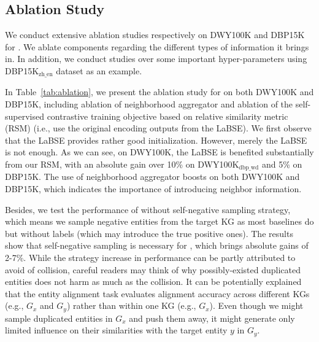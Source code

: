 





%

\subsection{Ablation Study} \label{sec:ablation}
We conduct extensive ablation studies respectively on DWY100K and DBP15K for \solution. We ablate components regarding the different types of information it brings in. In addition, we conduct studies over some important hyper-parameters using DBP15K$_{\text{zh\_en}}$ dataset as an example.
 
In Table~\ref{tab:ablation}, we present the ablation study for \solution on both DWY100K and DBP15K, including ablation of neighborhood aggregator and ablation of the self-supervised contrastive training objective based on relative similarity metric (RSM) (i.e., use the original encoding outputs from the LaBSE). We first observe that the LaBSE provides rather good initialization. However, merely the LaBSE is not enough. As we can see, on DWY100K, the LaBSE is benefited substantially from our RSM, with an absolute gain over 10\% on DWY100K$_{\text{dbp\_wd}}$ and 5\% on DBP15K. The use of neighborhood aggregator boosts \solution on both DWY100K and DBP15K, which indicates the importance of introducing neighbor information. 

Besides, we test the performance of \solution without self-negative sampling strategy, which means we sample negative entities from the target KG as most baselines do but without labels (which may introduce the true positive ones). The results show that self-negative sampling is necessary for \solution, which brings absolute gains of 2-7\%. While the strategy increase in performance can be partly attributed to avoid of collision, careful readers may think of why possibly-existed duplicated entities does not harm as much as the collision. It can be potentially explained that the entity alignment task evaluates alignment accuracy across different KGs (e.g., $G_x$ and $G_y$) rather than within one KG (e.g., $G_x$). Even though we might sample duplicated entities in $G_x$ and push them away, it might generate only limited influence on their similarities with the target entity $y$ in $G_y$.

